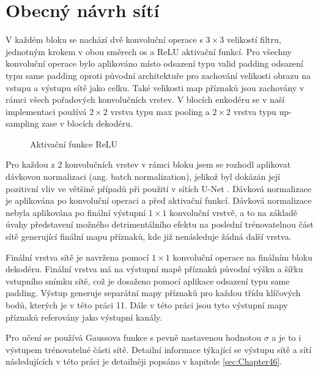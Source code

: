 \section{Obecný návrh sítí}
\label{sec:Chapter42}
V každém bloku se nachází dvě konvoluční operace s $3\times3$ velikostí filtru, jednotným krokem v obou směrech os a ReLU aktivační funkcí. Pro všechny konvoluční operace bylo aplikováno místo odsazení typu valid padding odsazení typu same padding oproti původní architektuře \cite{unet} pro zachování velikosti obrazu na vstupu a výstupu sítě jako celku. Také velikosti map příznaků jsou zachovány v rámci všech pořadových konvolučních vrstev. V blocích enkodéru se v naší implementaci používá $2\times2$ vrstva typu max pooling a $2\times2$ vrstva typu up-sampling zase v blocích dekodéru.

\begin{figure}[ht]
    \centering
    \caption[Aktivační funkce ReLU]{Aktivační funkce ReLU}
    \label{fig:relu}
\end{figure}

Pro každou z 2 konvolučních vrstev v rámci bloku jsem se rozhodl aplikovat dávkovou normalizaci (ang. batch normalization), jelikož byl dokázán její pozitivní vliv ve většině případů při použití v sítích U-Net \cite{unetnormalization}. Dávková normalizace je aplikována po konvoluční operaci a před aktivační funkcí. Dávková normalizace nebyla aplikována po finální výstupní $1\times1$ konvoluční vrstvě, a to na základě úvahy představení možného detrimentálního efektu na poslední trénovatelnou část sítě generující finální mapu příznaků, kde již nenásleduje žádná další vrstva.

Finální vrstva sítě je navržena pomocí $1\times1$ konvoluční operace na finálním bloku dekodéru. Finální vrstva má na výstupní mapě příznaků původní výšku a šířku vstupního snímku sítě, což je dosaženo pomocí aplikace odsazení typu same padding. Výstup generuje separátní mapy příznaků pro každou třídu klíčových bodů, kterých je v této práci 11. Dále v této práci jsou tyto výstupní mapy příznaků referovány jako výstupní kanály.

Pro učení se používá Gaussova funkce s pevně nastavenou hodnotou $\sigma$ a je to i výstupem trénovatelné části sítě. Detailní informace týkající se výstupu sítě a sítí následujících v této práci je detailněji popsáno v kapitole \ref{sec:Chapter46}.
\endinput